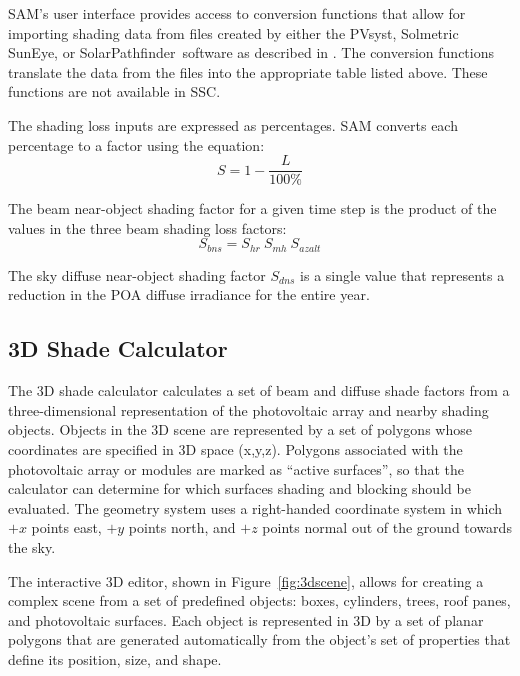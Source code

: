 \documentclass[12pt,letterpaper]{article}
\begin{document}
SAM's user interface provides access to conversion functions that allow for importing shading data from files created by either the PVsyst, Solmetric SunEye, or SolarPathfinder\texttrademark~software as described in \citet{help-shading}. The conversion functions translate the data from the files into the appropriate table listed above. These functions are not available in SSC.

The shading loss inputs are expressed as percentages. SAM converts each percentage to a factor using the equation:
\begin{equation}
S=1-\frac{L}{100\%}
\end{equation}

The beam near-object shading factor for a given time step is the product of the values in the three beam shading loss factors:
\begin{equation}\label{eqn-sbns}
S_{bns}=S_{hr}~S_{mh}~S_{azalt}
\end{equation}

The sky diffuse near-object shading factor $S_{dns}$ is a single value that represents a reduction in the POA diffuse irradiance for the entire year.

\subsection{3D Shade Calculator}\label{sec-3dshad}

The 3D shade calculator calculates a set of beam and diffuse shade factors from a three-dimensional representation of the photovoltaic array and nearby shading objects. Objects in the 3D scene are represented by a set of polygons whose coordinates are specified in 3D space (x,y,z).  Polygons associated with the photovoltaic array or modules are marked as ``active surfaces'', so that the calculator can determine for which surfaces shading and blocking should be evaluated.  The geometry system uses a right-handed coordinate system in which $+x$ points east, $+y$ points north, and $+z$ points normal out of the ground towards the sky. 

The interactive 3D editor, shown in Figure~\ref{fig:3dscene}, allows for creating a complex scene from a set of predefined objects: boxes, cylinders, trees, roof panes, and photovoltaic surfaces.  Each object is represented in 3D by a set of planar polygons that are generated automatically from the object's set of properties that define its position, size, and shape.  
\end{document}
